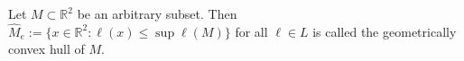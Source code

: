 Let $M \subset \mathbb{R}^2$ be an arbitrary subset. Then $\hat{M}_e := \{x \in \mathbb{R}^2 : \ell(x) \leq \sup \ell(M)\}$ for all $\ell \in L$ is called the geometrically convex hull of $M$.
